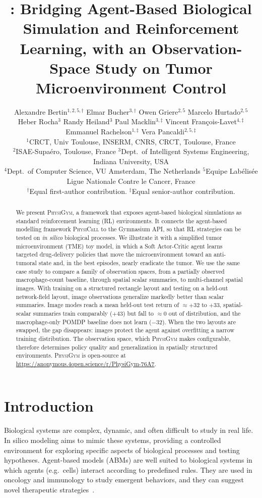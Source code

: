 \documentclass{article}
\title{\physigym{}: Bridging Agent-Based Biological Simulation and Reinforcement
  Learning, with an Observation-Space Study on Tumor Microenvironment Control}
\author{%
  Alexandre Bertin$^{1,2,5,\dagger}$ \quad
  Elmar Bucher$^{3,\dagger}$ \quad
  Owen Griere$^{2,5}$ \quad
  Marcelo Hurtado$^{2,5}$ \\
  Heber Rocha$^{3}$ \quad
  Randy Heiland$^{3}$ \quad
  Paul Macklin$^{3,\ddagger}$ \quad
  Vincent Fran\c{c}ois-Lavet$^{4,\ddagger}$ \\
  Emmanuel Rachelson$^{1,\ddagger}$ \quad
  Vera Pancaldi$^{2,5,\ddagger}$ \\[4pt]
  $^1$CRCT, Univ Toulouse, INSERM, CNRS, CRCT, Toulouse, France \\
  $^2$ISAE-Supaéro, Toulouse, France \quad
  $^3$Dept.\ of Intelligent Systems Engineering, Indiana University, USA \\
  $^4$Dept.\ of Computer Science, VU Amsterdam, The Netherlands \quad
  $^5$Equipe Labélisée Ligue Nationale Contre le Cancer, France \\[2pt]
  {\small $^\dagger$Equal first-author contribution. $^\ddagger$Equal senior-author contribution.}
}
\newcommand{\physigym}{\textsc{PhysiGym}}
\newcommand{\physicell}{\textsc{PhysiCell}}
\begin{document}
\maketitle

\begin{abstract}
We present \physigym{}, a framework that exposes agent-based biological
simulations as standard reinforcement learning (RL) environments. It connects
the agent-based modelling framework \physicell{} to the Gymnasium API, so that
RL strategies can be tested on \emph{in silico} biological processes.
We illustrate it with a simplified tumor microenvironment (TME) toy model, in
which a Soft Actor-Critic agent learns targeted drug-delivery policies that move
the microenvironment toward an anti-tumoral state and, in the best episodes,
nearly eradicate the tumor.
We use the same case study to compare a family of observation spaces, from a
partially observed macrophage-count baseline, through spatial scalar summaries,
to multi-channel spatial images.
With training on a structured rectangle layout and testing on a held-out
network-field layout, image observations generalize markedly better than scalar
summaries. Image modes reach a mean held-out test return of
${\approx}{+}32$ to $+33$, spatial-scalar summaries train comparably ($+43$)
but fall to ${\approx}0$ out of distribution, and the macrophage-only POMDP
baseline does not learn ($-32$). When the two layouts are swapped, the gap
disappears: images protect the agent against overfitting a narrow training
distribution. The observation space, which \physigym{} makes configurable,
therefore determines policy quality and generalization in spatially structured
environments.
\physigym{} is open-source at \url{https://anonymous.4open.science/r/PhysiGym-76A7}.
\end{abstract}

\section{Introduction}

Biological systems are complex, dynamic, and often difficult to study in real
life.
In silico modeling aims to mimic these systems, providing a controlled
environment for exploring specific aspects of biological processes and testing
hypotheses.
Agent-based models (ABMs) are well suited to biological systems in which
agents (e.g.\ cells) interact according to predefined rules. They are used in
oncology and immunology to study emergent behaviors, and they can suggest novel
therapeutic strategies~\citep{johnson2023digitize,
laubenbacher2024toward, rocha2024multiscale}.
\end{document}
